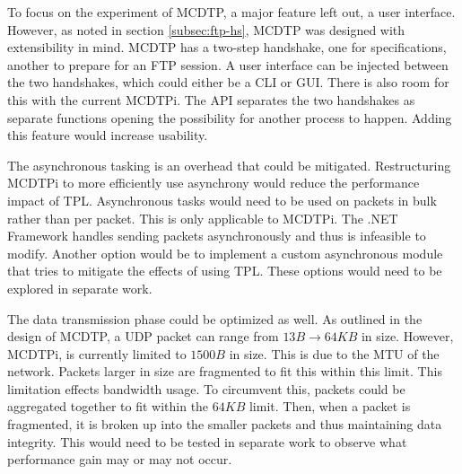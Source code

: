 To focus on the experiment of MCDTP, a major feature left out, a user interface. However, as noted in section \ref{subsec:ftp-hs}, MCDTP was designed with extensibility in mind. MCDTP has a two-step handshake, one for specifications, another to prepare for an FTP session. A user interface can be injected between the two handshakes, which could either be a CLI or GUI. There is also room for this with the current MCDTPi. The API separates the two handshakes as separate functions opening the possibility for another process to happen. Adding this feature would increase usability.

The asynchronous tasking is an overhead that could be mitigated. Restructuring MCDTPi to more efficiently use asynchrony would reduce the performance impact of TPL. Asynchronous tasks would need to be used on packets in bulk rather than per packet. This is only applicable to MCDTPi. The .NET Framework handles sending packets asynchronously and thus is infeasible to modify. Another option would be to implement a custom asynchronous module that tries to mitigate the effects of using TPL. These options would need to be explored in separate work.

The data transmission phase could be optimized as well. As outlined in the design of MCDTP, a UDP packet can range from $13B \rightarrow 64KB$ in size. However, MCDTPi, is currently limited to $1500B$ in size. This is due to the MTU of the network. Packets larger in size are fragmented to fit this within this limit. This limitation effects bandwidth usage. To circumvent this, packets could be aggregated together to fit within the $64KB$ limit. Then, when a packet is fragmented, it is broken up into the smaller packets and thus maintaining data integrity. This would need to be tested in separate work to observe what performance gain may or may not occur.
